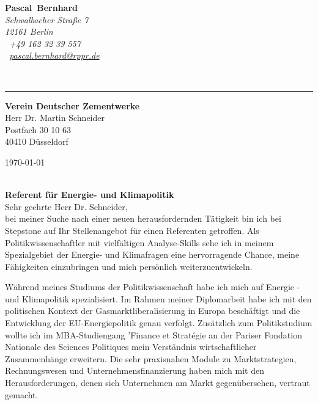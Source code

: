 \documentclass[10pt,a4paper]{article}
\def\firstname{Pascal}
\def\familyname{Bernhard}
\begin{document}
\sffamily   %
\hfill%
\begin{minipage}[t]{.6\textwidth}
	\raggedleft%
	{\bfseries {\color{firstnamecolor}\firstname}~{\color{familynamecolor}\familyname}}\\[.35ex]
	\small\itshape%
	Schwalbacher Straße 7\\
	12161 Berlin\\[.35ex]
	\Mobilefone~+49 162 32 39 557 \\
	\Letter~\href{mailto:pascal.bernhard@rppr.de}{pascal.bernhard@rppr.de}
\end{minipage}\\[0.5em]
%
{\color{firstnamecolor}\rule{\textwidth}{.25ex}}
%
\begin{minipage}[t]{.4\textwidth}
	\raggedright%
	\vspace*{1em}
	\textbf{Verein Deutscher Zementwerke} \\
	 Herr Dr. Martin Schneider\\[.35ex]
	\small%
	Postfach 30 10 63\\
	40410 Düsseldorf
\end{minipage}
%
\hfill
%
\begin{minipage}[t]{.4\textwidth}
	\raggedleft %
	\today
\end{minipage}\\[1em]
{\bfseries \color{familynamecolor}Referent für Energie- und Klimapolitik}\\[0.75em]

Sehr geehrte Herr Dr. Schneider,\\[0.5em]
%
bei meiner Suche nach einer neuen herausfordernden Tätigkeit bin ich bei Stepstone auf Ihr Stellenangebot für einen Referenten getroffen. Als Politikwissenschaftler mit vielfältigen Analyse-Skills sehe ich in meinem Spezialgebiet der Energie- und Klimafragen eine hervorragende Chance, meine Fähigkeiten einzubringen und mich persönlich weiterzuentwickeln.


Während meines Studiums der Politikwissenschaft habe ich mich auf Energie - und Klimapolitik  spezialisiert. Im Rahmen meiner Diplomarbeit habe ich mit den politischen Kontext der Gasmarktliberalisierung in Europa beschäftigt und die Entwicklung der EU-Energiepolitik genau verfolgt. Zusätzlich zum Politikstudium wollte ich im MBA-Studiengang 'Finance et Strat\'{e}gie an der Pariser Fondation Nationale des Sciences Politiques mein Verständnis wirtschaftlicher Zusammenhänge erweitern. Die sehr praxisnahen Module zu Marktstrategien, Rechnungswesen und Unternehmensfinanzierung haben mich mit den Herausforderungen, denen sich Unternehmen am Markt gegenübersehen, vertraut gemacht.
\end{document}
